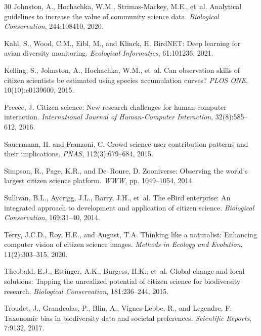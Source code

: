 \documentclass[11pt,a4paper]{article}
\begin{document}
\begin{thebibliography}{30}
Johnston, A., Hochachka, W.M., Strimas-Mackey, M.E., et~al.
\newblock Analytical guidelines to increase the value of community science data.
\newblock \emph{Biological Conservation}, 244:108410, 2020.

Kahl, S., Wood, C.M., Eibl, M., and Klinck, H.
\newblock BirdNET: Deep learning for avian diversity monitoring.
\newblock \emph{Ecological Informatics}, 61:101236, 2021.

Kelling, S., Johnston, A., Hochachka, W.M., et~al.
\newblock Can observation skills of citizen scientists be estimated using species
  accumulation curves?
\newblock \emph{PLOS ONE}, 10(10):e0139600, 2015.

Preece, J.
\newblock Citizen science: New research challenges for human-computer
  interaction.
\newblock \emph{International Journal of Human-Computer Interaction},
  32(8):585--612, 2016.

Sauermann, H. and Franzoni, C.
\newblock Crowd science user contribution patterns and their implications.
\newblock \emph{PNAS}, 112(3):679--684, 2015.

Simpson, R., Page, K.R., and De~Roure, D.
\newblock Zooniverse: Observing the world's largest citizen science platform.
\newblock \emph{WWW}, pp. 1049--1054, 2014.

Sullivan, B.L., Aycrigg, J.L., Barry, J.H., et~al.
\newblock The eBird enterprise: An integrated approach to development and
  application of citizen science.
\newblock \emph{Biological Conservation}, 169:31--40, 2014.

Terry, J.C.D., Roy, H.E., and August, T.A.
\newblock Thinking like a naturalist: Enhancing computer vision of citizen
  science images.
\newblock \emph{Methods in Ecology and Evolution}, 11(2):303--315, 2020.

Theobald, E.J., Ettinger, A.K., Burgess, H.K., et~al.
\newblock Global change and local solutions: Tapping the unrealized potential
  of citizen science for biodiversity research.
\newblock \emph{Biological Conservation}, 181:236--244, 2015.

Troudet, J., Grandcolas, P., Blin, A., Vignes-Lebbe, R., and Legendre, F.
\newblock Taxonomic bias in biodiversity data and societal preferences.
\newblock \emph{Scientific Reports}, 7:9132, 2017.


\end{thebibliography}
\end{document}
